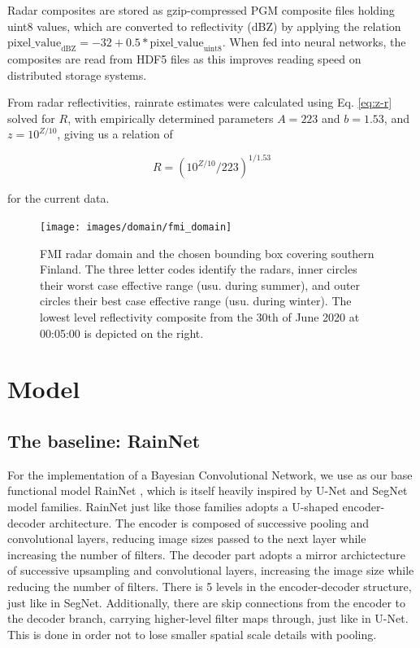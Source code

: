 

Radar composites are stored as gzip-compressed PGM composite files holding uint8 values, which are converted to reflectivity (dBZ) by applying the relation $\text{pixel\_value}_{\text{dBZ}} = -32 + 0.5 * \text{pixel\_value}_{\text{uint8}}$. When fed into neural networks, the composites are read from HDF5 files as this improves reading speed on distributed storage systems. 

From radar reflectivities, rainrate estimates were calculated using Eq. \ref{eq:z-r} solved for $R$, with empirically determined parameters $A=223$ and $b=1.53$, and $z = 10^{Z / 10}$, giving us a relation of

\begin{equation}
\label{eq:dbz_to_r}
R = (10^{Z / 10} / 223)^{1/1.53}
\end{equation}

for the current data. 

\begin{figure}
	\label{fig:domain}
	\centering
	\texttt{[image: images/domain/fmi\_domain]}
	\caption{FMI radar domain and the chosen bounding box covering southern Finland. The three letter codes identify the radars, inner circles their worst case effective range (usu. during summer), and outer circles their best case effective range (usu. during winter). The lowest level reflectivity composite from the 30th of June 2020 at 00:05:00 is depicted on the right.}
\end{figure} 


\section{Model}

\subsection{The baseline: RainNet}
\label{section:rainnet}

For the implementation of a Bayesian Convolutional Network, we use as our base functional model RainNet \cite{ayzel_rainnet_nodate}, which is itself heavily inspired by U-Net and SegNet model families. RainNet just like those families adopts a U-shaped encoder-decoder architecture. The encoder is composed of successive pooling and convolutional layers, reducing image sizes passed to the next layer while increasing the number of filters. The decoder part adopts a mirror archictecture of successive upsampling and convolutional layers, increasing the image size while reducing the number of filters. There is 5 levels in the encoder-decoder structure, just like in SegNet. Additionally, there are skip connections from the encoder to the decoder branch, carrying higher-level filter maps through, just like in U-Net. This is done in order not to lose smaller spatial scale details with pooling.  

